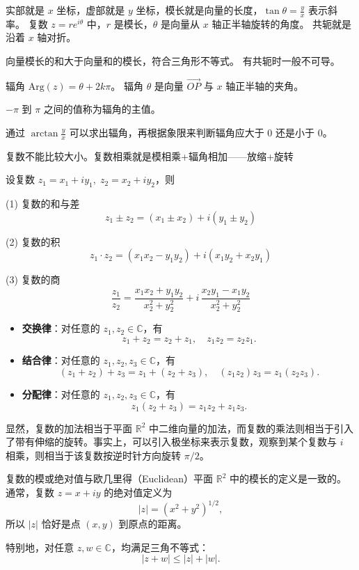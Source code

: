 \documentclass[lang=cn,10pt]{elegantbook}
\begin{document}
\begin{dxtips}
    实部就是 $x$ 坐标，虚部就是 $y$ 坐标，模长就是向量的长度，$\tan\theta = \tfrac{y}{x}$ 表示斜率。  
复数 $z = re^{i\theta}$ 中，$r$ 是模长，$\theta$ 是向量从 $x$ 轴正半轴旋转的角度。  
共轭就是沿着 $x$ 轴对折。  

向量模长的和大于向量和的模长，符合三角形不等式。  
有共轭时一般不可导。  

辐角 $\mathrm{Arg}(z) = \theta + 2k\pi$。  
辐角 $\theta$ 是向量 $\overrightarrow{OP}$ 与 $x$ 轴正半轴的夹角。  

$-\pi$ 到 $\pi$ 之间的值称为辐角的主值。  

通过 $\arctan \tfrac{y}{x}$ 可以求出辐角，再根据象限来判断辐角应大于 $0$ 还是小于 $0$。  

复数不能比较大小。复数相乘就是模相乘+辐角相加——放缩+旋转
\end{dxtips}
\begin{theorem}[复数的运算法则]
    设复数 $z_1 = x_1 + i y_1,\; z_2 = x_2 + i y_2$，则  

(1) 复数的和与差  
\[
z_1 \pm z_2 = (x_1 \pm x_2) + i (y_1 \pm y_2)
\]

(2) 复数的积  
\[
z_1 \cdot z_2 = (x_1 x_2 - y_1 y_2) + i (x_1 y_2 + x_2 y_1)
\]

(3) 复数的商  
\[
\frac{z_1}{z_2} = 
\frac{x_1 x_2 + y_1 y_2}{x_2^2 + y_2^2}
+ i \, \frac{x_2 y_1 - x_1 y_2}{x_2^2 + y_2^2}
\]
\end{theorem}
\begin{theorem}[复平面的代数运算的基本运算律。]
    \begin{itemize}
  \item \textbf{交换律}：对任意的 $z_1, z_2 \in \mathbb{C}$，有
  \[
  z_1 + z_2 = z_2 + z_1, \quad z_1 z_2 = z_2 z_1.
  \]

  \item \textbf{结合律}：对任意的 $z_1, z_2, z_3 \in \mathbb{C}$，有
  \[
  (z_1+z_2)+z_3 = z_1+(z_2+z_3), \quad (z_1 z_2)z_3 = z_1(z_2 z_3).
  \]

  \item \textbf{分配律}：对任意的 $z_1, z_2, z_3 \in \mathbb{C}$，有
  \[
  z_1(z_2+z_3) = z_1 z_2 + z_1 z_3.
  \]
\end{itemize}

显然，复数的加法相当于平面 $\mathbb{R}^2$ 中二维向量的加法，而复数的乘法则相当于引入了带有伸缩的旋转。事实上，可以引入极坐标来表示复数，观察到某个复数与 $i$ 相乘，则相当于该复数按逆时针方向旋转 $\pi/2$。

复数的模或绝对值与欧几里得（Euclidean）平面 $\mathbb{R}^2$ 中的模长的定义是一致的。通常，复数 $z = x + iy$ 的绝对值定义为
\[
|z| = (x^2+y^2)^{1/2},
\]
所以 $|z|$ 恰好是点 $(x,y)$ 到原点的距离。

特别地，对任意 $z, w \in \mathbb{C}$，均满足三角不等式：
\[
|z+w| \leq |z| + |w|.
\]
\end{theorem}
\end{document}
